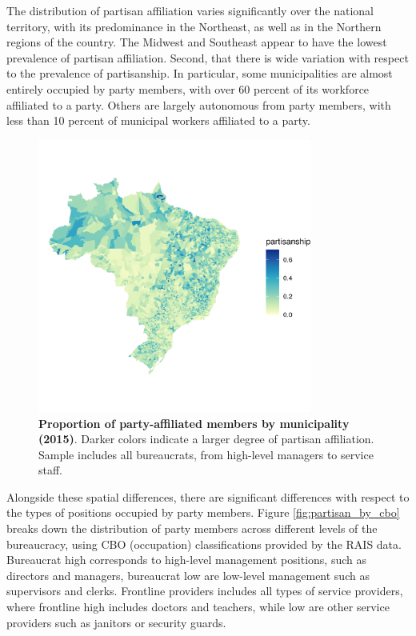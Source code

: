 \documentclass[12pt,a4paper]{article}
\begin{document}
The distribution of partisan affiliation varies significantly over the national territory, with its predominance in the Northeast, as well as in the Northern regions of the country. The Midwest and Southeast appear to have the lowest prevalence of partisan affiliation. Second, that there is wide variation with respect to the prevalence of partisanship. In particular, some municipalities are almost entirely occupied by party members, with over 60 percent of its workforce affiliated to a party. Others are largely autonomous from party members, with less than 10 percent of municipal workers affiliated to a party.

\begin{figure}[H]
    \centering
    \includegraphics[width = 9cm, height = 9cm]{figures/maps/pooled.png}
    \caption{\textbf{Proportion of party-affiliated members by municipality (2015)}. Darker colors indicate a larger degree of partisan affiliation. Sample includes all bureaucrats, from high-level managers to service staff.}
    \label{fig:map_pooled}
\end{figure}

Alongside these spatial differences, there are significant differences with respect to the types of positions occupied by party members. Figure \ref{fig:partisan_by_cbo} breaks down the distribution of party members across different levels of the bureaucracy, using CBO (occupation) classifications provided by the RAIS data. Bureaucrat high corresponds to high-level management positions, such as directors and managers, bureaucrat low are low-level management such as supervisors and clerks. Frontline providers includes all types of service providers, where frontline high includes doctors and teachers, while low are other service providers such as janitors or security guards. 
\end{document}
